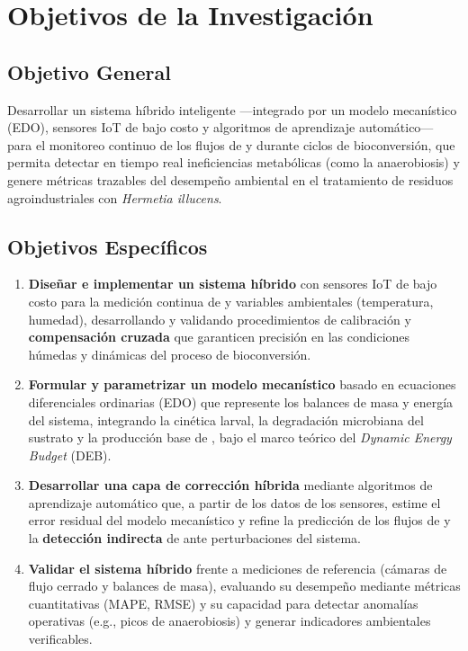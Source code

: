 \chapter{Objetivos de la Investigación}

\section{Objetivo General}

Desarrollar un sistema híbrido inteligente —integrado por un modelo mecanístico (EDO), sensores IoT de bajo costo y algoritmos de aprendizaje automático— para el monitoreo continuo de los flujos de  y  durante ciclos de bioconversión, que permita detectar en tiempo real ineficiencias metabólicas (como la anaerobiosis) y genere métricas trazables del desempeño ambiental en el tratamiento de residuos agroindustriales con \textit{Hermetia illucens}.

\section{Objetivos Específicos}

\begin{enumerate}
    \item \textbf{Diseñar e implementar un sistema híbrido} con sensores IoT de bajo costo para la medición continua de  y variables ambientales (temperatura, humedad), desarrollando y validando procedimientos de calibración y \textbf{compensación cruzada} que garanticen precisión en las condiciones húmedas y dinámicas del proceso de bioconversión.
    
    \item \textbf{Formular y parametrizar un modelo mecanístico} basado en ecuaciones diferenciales ordinarias (EDO) que represente los balances de masa y energía del sistema, integrando la cinética larval, la degradación microbiana del sustrato y la producción base de , bajo el marco teórico del \textit{Dynamic Energy Budget} (DEB).
    
    \item \textbf{Desarrollar una capa de corrección híbrida} mediante algoritmos de aprendizaje automático que, a partir de los datos de los sensores, estime el error residual del modelo mecanístico y refine la predicción de los flujos de  y la \textbf{detección indirecta} de  ante perturbaciones del sistema.
    
    \item \textbf{Validar el sistema híbrido} frente a mediciones de referencia (cámaras de flujo cerrado y balances de masa), evaluando su desempeño mediante métricas cuantitativas (MAPE, RMSE) y su capacidad para detectar anomalías operativas (e.g., picos de anaerobiosis) y generar indicadores ambientales verificables.
\end{enumerate}